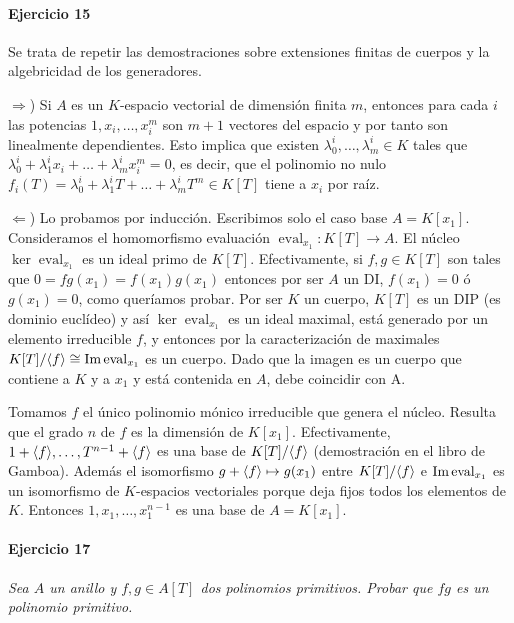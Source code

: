 \documentclass[../main.tex]{subfiles}
\begin{document}
\paragraph{Ejercicio 15}

Se trata de repetir las demostraciones sobre extensiones finitas de cuerpos y la algebricidad de los generadores.

$\Rightarrow$) Si $A$ es un $K$-espacio vectorial de dimensión finita $m$, entonces para cada $i$ las potencias $1, x_i, \ldots, x_i^m$ son $m+1$ vectores del espacio y por tanto son linealmente dependientes. Esto implica que existen $\lambda^i_0, \dots, \lambda^i_m \in K$ tales que $\lambda^i_0 + \lambda^i_1x_i + \ldots+\lambda^i_mx_i^m = 0$, es decir, que el polinomio no nulo $f_i(T) = \lambda^i_0 + \lambda^i_1 T + \ldots+\lambda^i_m T^m \in K[T]$ tiene a $x_i$ por raíz.

$\Leftarrow$) Lo probamos por inducción. Escribimos solo el caso base $A=K[x_1]$. Consideramos el homomorfismo evaluación $\operatorname{eval}_{x_1}:K[T]\to A$. El núcleo $\ker \operatorname{eval}_{x_1}$ es un ideal primo de $K[T]$. Efectivamente, si $f, g \in K[T]$ son tales que $0 = fg (x_1) = f(x_1)g(x_1)$ entonces por ser $A$ un DI, $f(x_1)=0$ ó $g(x_1) = 0$, como queríamos probar. Por ser $K$ un cuerpo, $K[T]$ es un DIP (es dominio euclídeo) y así $\ker \operatorname{eval}_{x_1}$ es un ideal maximal, está generado por un elemento irreducible $f$, y entonces por la caracterización de maximales $K[T]/\langle f \rangle \cong \text{Im} \operatorname{eval}_{x_1}$ es un cuerpo. Dado que la imagen es un cuerpo que contiene a $K$ y a $x_1$ y está contenida en $A$, debe coincidir con A.

Tomamos $f$ el único polinomio mónico irreducible que genera el núcleo. Resulta que el grado  $n$ de $f$ es la dimensión de $K[x_1]$. Efectivamente, $1+\langle f \rangle, \dots, T^{n-1}+\langle f \rangle$ es una base de $K[T]/\langle f \rangle$ (demostración en el libro de Gamboa). Además el isomorfismo $g+\langle f \rangle \mapsto g(x_1)$ entre $K[T]/\langle f \rangle$ e $\text{Im} \operatorname{eval}_{x_1}$ es un isomorfismo de $K$-espacios vectoriales porque deja fijos todos los elementos de $K$. Entonces $1, x_1, \ldots, x_1^{n-1}$ es una base de $A=K[x_1]$.

\paragraph{Ejercicio 17} \textit{Sea $A$ un anillo y $f, g\in A[T]$ dos polinomios primitivos. Probar que $fg$ es un polinomio primitivo.}
\end{document}
